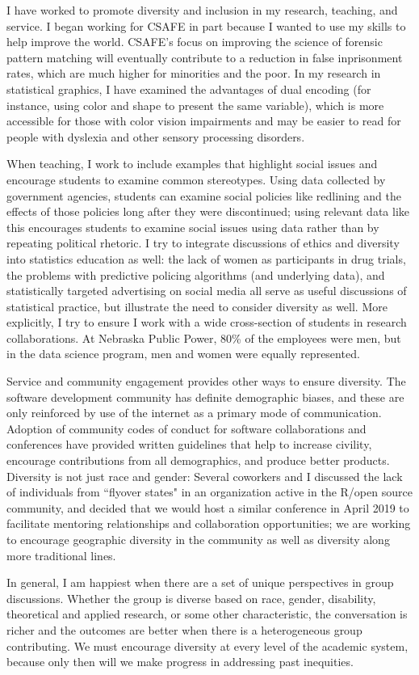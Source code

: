\documentclass[12pt, letterpaper, sans]{moderncv}
\begin{document}
I have worked to promote diversity and inclusion in my research, teaching, and service. I began working for CSAFE in part because I wanted to use my skills to help improve the world. CSAFE's focus on improving the science of forensic pattern matching will eventually contribute to a reduction in false inprisonment rates, which are much higher for minorities and the poor. In my research in statistical graphics, I have examined the advantages of dual encoding (for instance, using color and shape to present the same variable), which is more accessible for those with color vision impairments and may be easier to read for people with dyslexia and other sensory processing disorders. 

When teaching, I work to include examples that highlight social issues and encourage students to examine common stereotypes. Using data collected by government agencies, students can examine social policies like redlining and the effects of those policies long after they were discontinued; using relevant data like this encourages students to examine social issues using data rather than by repeating political rhetoric.  I try to integrate discussions of ethics and diversity into statistics education as well: the lack of women as participants in drug trials, the problems with predictive policing algorithms (and underlying data), and statistically targeted advertising on social media all serve as useful discussions of statistical practice, but illustrate the need to consider diversity as well. More explicitly, I try to ensure I work with a wide cross-section of students in research collaborations. At Nebraska Public Power, 80\% of the employees were men, but in the data science program, men and women were equally represented. 

Service and community engagement provides other ways to ensure diversity. The software development community has definite demographic biases, and these are only reinforced by use of the internet as a primary mode of communication. Adoption of community codes of conduct for software collaborations and conferences have provided written guidelines that help to increase civility, encourage contributions from all demographics, and produce better products. Diversity is not just race and gender: Several coworkers and I discussed the lack of individuals from ``flyover states" in an organization active in the R/open source community, and decided that we would host a similar conference in April 2019 to facilitate mentoring relationships and collaboration opportunities; we are working to encourage geographic diversity in the community as well as diversity along more traditional lines. 

In general, I am happiest when there are a set of unique perspectives in group discussions. Whether the group is diverse based on race, gender, disability, theoretical and applied research, or some other characteristic, the conversation is richer and the outcomes are better when there is a heterogeneous group contributing. We must encourage diversity at every level of the academic system, because only then will we make progress in addressing past inequities. 
\end{document}

